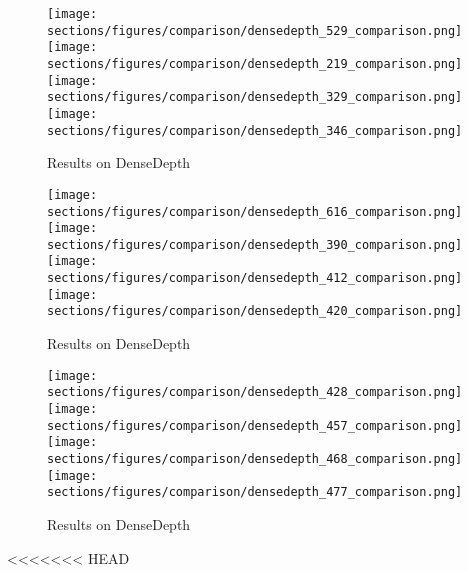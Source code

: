 \begin{figure*}
  \texttt{[image: sections/figures/comparison/densedepth\_529\_comparison.png]}
  \texttt{[image: sections/figures/comparison/densedepth\_219\_comparison.png]}
  \texttt{[image: sections/figures/comparison/densedepth\_329\_comparison.png]}
  \texttt{[image: sections/figures/comparison/densedepth\_346\_comparison.png]}
  \caption{Results on DenseDepth}
\end{figure*}
\begin{figure*}
  \texttt{[image: sections/figures/comparison/densedepth\_616\_comparison.png]}
  \texttt{[image: sections/figures/comparison/densedepth\_390\_comparison.png]}
  \texttt{[image: sections/figures/comparison/densedepth\_412\_comparison.png]}
  \texttt{[image: sections/figures/comparison/densedepth\_420\_comparison.png]}
  \caption{Results on DenseDepth}
\end{figure*}
\begin{figure*}
  \texttt{[image: sections/figures/comparison/densedepth\_428\_comparison.png]}
  \texttt{[image: sections/figures/comparison/densedepth\_457\_comparison.png]}
  \texttt{[image: sections/figures/comparison/densedepth\_468\_comparison.png]}
  \texttt{[image: sections/figures/comparison/densedepth\_477\_comparison.png]}
  \caption{Results on DenseDepth}
\end{figure*}
<<<<<<< HEAD


